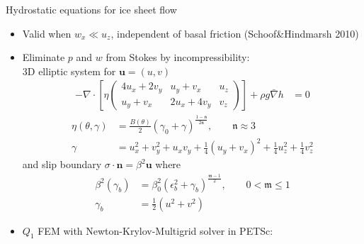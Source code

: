 \begin{frame}{Hydrostatic equations for ice sheet flow}
  \begin{itemize}
  \item Valid when $w_x \ll u_z$, independent of basal friction {\small (Schoof\&Hindmarsh 2010)}
  \item Eliminate $p$ and $w$ from Stokes by incompressibility:\\
    \quad 3D elliptic system for $\bm u = (u,v)$
    \begin{align*}
      - \nabla\cdot \left[ \eta
        \begin{pmatrix}
          4 u_x + 2 v_y & u_y + v_x & u_z \\
          u_y + v_x & 2 u_x + 4 v_y & v_z
        \end{pmatrix} \right] + \rho g \bar\nabla h & = 0
    \end{align*}
    \begin{align*}
      \eta(\theta,\gamma) &= \frac{B(\theta)}{2} (\gamma_0 + \gamma)^{\frac{1-\mathfrak n}{2\mathfrak n}}, \qquad \mathfrak n \approx 3 \\
      \gamma &= u_x^2 + v_y^2 + u_xv_y + \frac 1 4 (u_y+v_x)^2 + \frac 1 4 u_z^2 + \frac 1 4 v_z^2
    \end{align*}
    and slip boundary $\sigma \cdot \bm n = \beta^2 \bm u$ where
    \begin{align*}
      \beta^2(\gamma_b) &= \beta_0^2 (\epsilon_b^2 + \gamma_b)^{\frac{\mathfrak m-1}{2}}, \qquad 0 < \mathfrak m \le 1 \\
      \gamma_b &= \frac 1 2 (u^2 + v^2)
    \end{align*}
  \item $Q_1$ FEM with Newton-Krylov-Multigrid solver in PETSc: 
  \end{itemize}
\end{frame}
